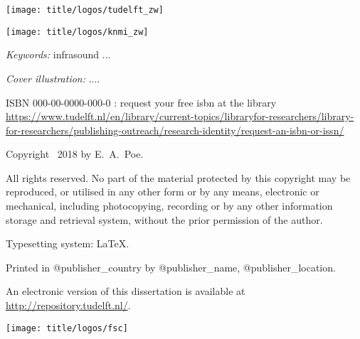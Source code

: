 \begin{titlepage}
\vfill
%
\noindent
\begin{minipage}[b]{0.5\textwidth}
	\begin{center}%
		\texttt{[image: title/logos/tudelft\_zw]}%
	\end{center}%
	\vspace{-0.95mm}
\end{minipage}
\begin{minipage}[b]{0.5\textwidth}
	\begin{center}%
		\texttt{[image: title/logos/knmi\_zw]}%
	\end{center}%
\end{minipage}
%
\vfill

\noindent \textit{Keywords:} infrasound ...

\bigskip
\noindent \textit{Cover illustration:} ....

\bigskip
\bigskip

\noindent ISBN 000-00-0000-000-0 : request your free isbn at the library \url{https://www.tudelft.nl/en/library/current-topics/libraryfor-researchers/library-for-researchers/publishing-outreach/research-identity/request-an-isbn-or-issn/}

\bigskip

\noindent Copyright \textcopyright\ 2018 by E.~A.~Poe.

\medskip
\noindent All rights reserved. No part of the material protected by this copyright may be reproduced, or utilised in any other form or by any means, electronic or mechanical, including photocopying, recording or by any other information storage and retrieval system, without the prior permission of the author.

\bigskip
\noindent
\begin{minipage}[c]{0.75\textwidth}

\noindent Typesetting system: \LaTeX.

\noindent Printed in @publisher\_country by @publisher\_name, @publisher\_location.

\medskip
\noindent An electronic version of this dissertation is available at \\
\url{http://repository.tudelft.nl/}.

\end{minipage}
\begin{minipage}[c]{0.25\textwidth}
\hfill \texttt{[image: title/logos/fsc]}
\end{minipage}


\end{titlepage}
